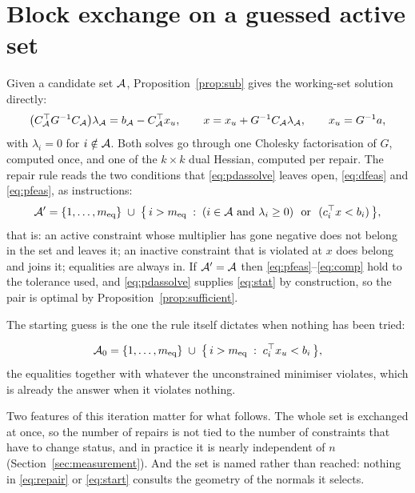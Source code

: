 \section{Block exchange on a guessed active set}
\label{sec:exchange}

Given a candidate set $\mathcal{A}$, Proposition~\ref{prop:sub} gives the working-set
solution directly:
\begin{equation}
  \bigl(C_{\mathcal{A}}^{\top} G^{-1} C_{\mathcal{A}}\bigr)\lambda_{\mathcal{A}}
   = b_{\mathcal{A}} - C_{\mathcal{A}}^{\top} x_u,
  \qquad
  x = x_u + G^{-1}C_{\mathcal{A}} \lambda_{\mathcal{A}},
  \qquad x_u = G^{-1}a,
  \label{eq:pdassolve}
\end{equation}
with $\lambda_i = 0$ for $i \notin \mathcal{A}$. Both solves go through one Cholesky
factorisation of $G$, computed once, and one of the $k \times k$ dual Hessian,
computed per repair. The repair rule reads the two conditions that
\eqref{eq:pdassolve} leaves open, \eqref{eq:dfeas} and \eqref{eq:pfeas}, as
instructions:
\begin{equation}
  \mathcal{A}' = \{1,\dots,m_{\mathrm{eq}}\} \;\cup\;
  \bigl\{\, i > m_{\mathrm{eq}} \;:\;
    (i \in \mathcal{A} \text{ and } \lambda_i \ge 0)
    \ \text{ or }\
    (c_i^{\top} x < b_i) \,\bigr\},
  \label{eq:repair}
\end{equation}
that is: an active constraint whose multiplier has gone negative does not belong
in the set and leaves it; an inactive constraint that is violated at $x$ does
belong and joins it; equalities are always in. If $\mathcal{A}' = \mathcal{A}$ then
\eqref{eq:pfeas}--\eqref{eq:comp} hold to the tolerance used, and
\eqref{eq:pdassolve} supplies \eqref{eq:stat} by construction, so the pair is
optimal by Proposition~\ref{prop:sufficient}.

The starting guess is the one the rule itself dictates when nothing has been tried:

\begin{equation}
  \mathcal{A}_0 = \{1,\dots,m_{\mathrm{eq}}\} \;\cup\;
  \bigl\{\, i > m_{\mathrm{eq}} \;:\; c_i^{\top} x_u < b_i \,\bigr\},
  \label{eq:start}
\end{equation}
the equalities together with whatever the unconstrained minimiser violates, which
is already the answer when it violates nothing.

Two features of this iteration matter for what follows. The whole set is exchanged
at once, so the number of repairs is not tied to the number of constraints that
have to change status, and in practice it is nearly independent of $n$
(Section~\ref{sec:measurement}). And the set is named rather than reached: nothing
in \eqref{eq:repair} or \eqref{eq:start} consults the geometry of the normals it
selects.


